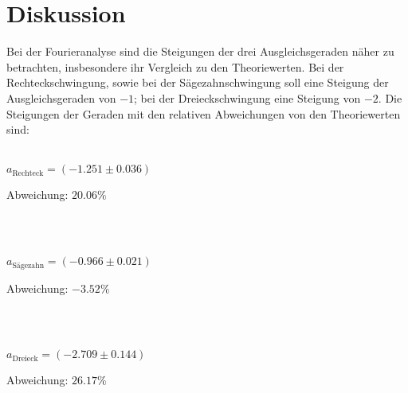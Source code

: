 \section{Diskussion}
\label{sec:Diskussion}
Bei der Fourieranalyse sind die Steigungen der drei Ausgleichsgeraden näher zu betrachten, insbesondere ihr Vergleich zu den 
Theoriewerten. Bei der Rechteckschwingung, sowie bei der Sägezahnschwingung soll eine Steigung der Ausgleichsgeraden von $-1$;
bei der Dreieckschwingung eine Steigung von $-2$. Die Steigungen der Geraden mit den relativen Abweichungen von den Theoriewerten 
sind: 
\\ \\
\centerline{$a_\text{Rechteck} = ( -1.251 \pm 0.036 ) $}
\centerline{Abweichung: $20.06\%$}
\\ \\
\centerline{$ a_\text{Sägezahn} = (- 0.966 \pm 0.021)$}
\centerline{Abweichung: $-3.52 \% $}
\\ \\
\centerline{$a_\text{Dreieck} = ( -2.709 \pm 0.144 )$}
\centerline{Abweichung: $26.17 \%$}
\\ \\
